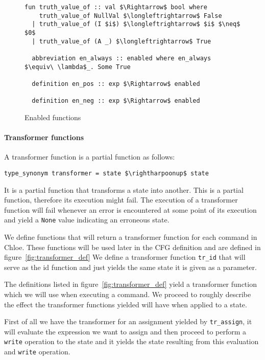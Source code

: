 \begin{figure}
  \begin{lstlisting}[frame=single, mathescape=true]
  fun truth_value_of :: val $\Rightarrow$ bool where
    truth_value_of NullVal $\longleftrightarrow$ False
  | truth_value_of (I $i$) $\longleftrightarrow$ $i$ $\neq$ $0$
  | truth_value_of (A _) $\longleftrightarrow$ True

  abbreviation en_always :: enabled where en_always $\equiv\ \lambda$_. Some True

  definition en_pos :: exp $\Rightarrow$ enabled

  definition en_neg :: exp $\Rightarrow$ enabled
  \end{lstlisting}

  \caption{Enabled functions}
  \label{fig:enabled_def}
\end{figure}


\paragraph{Transformer functions}\label{paragraph:transformer}

A transformer function is a partial function as follows:

\begin{lstlisting}[mathescape=true, frame=single]
type_synonym transformer = state $\rightharpoonup$ state
\end{lstlisting}

It is a partial function that transforms a state into another.
This is a partial function, therefore its execution might fail.
The execution of a transformer function will fail whenever an error is encountered at some point of its execution and yield a \verb|None| value indicating an erroneous state.

We define functions that will return a transformer function for each command in Chloe.
These functions will be used later in the CFG definition and are defined in figure~\ref{fig:transformer_def}
We define a transformer function \verb|tr_id| that will serve as the id function and just yields the same state it is given as a parameter.

The definitions listed in figure~\ref{fig:transformer_def} yield a transformer function which we will use when executing a command.
We proceed to roughly describe the effect the transformer functions yielded will have when applied to a state.

First of all we have the transformer for an assignment yielded by \verb|tr_assign|, it will evaluate the expression we want to assign and then proceed to perform a \verb|write| operation to the state and it yields the state resulting from this evaluation and \verb|write| operation.

